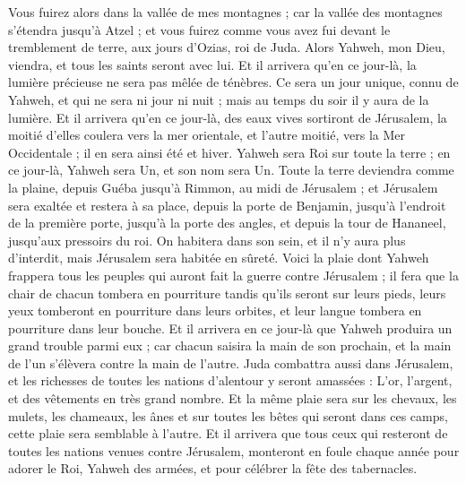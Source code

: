 \begin{multicols}{2}
Vous fuirez alors dans la vallée de mes montagnes ; car la vallée des montagnes s'étendra jusqu'à Atzel ; et vous fuirez comme vous avez fui devant le tremblement de terre, aux jours d'Ozias, roi de Juda. Alors Yahweh, mon Dieu, viendra, et tous les saints seront avec lui.
Et il arrivera qu'en ce jour-là, la lumière précieuse ne sera pas mêlée de ténèbres.
Ce sera un jour unique, connu de Yahweh, et qui ne sera ni jour ni nuit ; mais au temps du soir il y aura de la lumière.
Et il arrivera qu'en ce jour-là, des eaux vives sortiront de Jérusalem, la moitié d'elles coulera vers la mer orientale, et l'autre moitié, vers la Mer Occidentale ; il en sera ainsi été et hiver.
Yahweh sera Roi sur toute la terre ; en ce jour-là, Yahweh sera Un, et son nom sera Un.
Toute la terre deviendra comme la plaine, depuis Guéba jusqu'à Rimmon, au midi de Jérusalem ; et Jérusalem sera exaltée et restera à sa place, depuis la porte de Benjamin, jusqu'à l'endroit de la première porte, jusqu'à la porte des angles, et depuis la tour de Hananeel, jusqu'aux pressoirs du roi.
On habitera dans son sein, et il n'y aura plus d'interdit, mais Jérusalem sera habitée en sûreté.
Voici la plaie dont Yahweh frappera tous les peuples qui auront fait la guerre contre Jérusalem ; il fera que la chair de chacun tombera en pourriture tandis qu'ils seront sur leurs pieds, leurs yeux tomberont en pourriture dans leurs orbites, et leur langue tombera en pourriture dans leur bouche.
Et il arrivera en ce jour-là que Yahweh produira un grand trouble parmi eux ; car chacun saisira la main de son prochain, et la main de l'un s'élèvera contre la main de l'autre.
Juda combattra aussi dans Jérusalem, et les richesses de toutes les nations d'alentour y seront amassées : L'or, l'argent, et des vêtements en très grand nombre.
Et la même plaie sera sur les chevaux, les mulets, les chameaux, les ânes et sur toutes les bêtes qui seront dans ces camps, cette plaie sera semblable à l'autre.
Et il arrivera que tous ceux qui resteront de toutes les nations venues contre Jérusalem, monteront en foule chaque année pour adorer le Roi, Yahweh des armées, et pour célébrer la fête des tabernacles.

\end{multicols}
